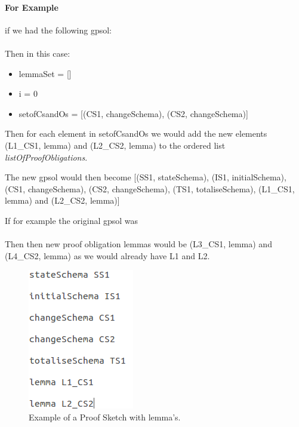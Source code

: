 \paragraph{For Example}

if we had the following \gls{gpsol}: \\
 \\
Then in this case:
\begin{itemize}
\item lemmaSet = []
\item i = 0
\item setofCsandOs = [(CS1, changeSchema), (CS2, changeSchema)]
\end{itemize}

Then for each element in setofCsandOs we would add the new elements (L1\_CS1,
lemma) and (L2\_CS2, lemma) to the ordered list \emph{listOfProofObligations}.

The new \gls{gpsol} would then become [(SS1, stateSchema), (IS1, initialSchema),
(CS1, changeSchema), (CS2, changeSchema), (TS1, totaliseSchema), (L1\_CS1,
lemma) and (L2\_CS2, lemma)]

If for example the original \gls{gpsol} was \\
\\
Then then new proof obligation lemmas would be (L3\_CS1, lemma) and (L4\_CS2,
lemma) as we would already have L1 and L2.

\begin{figure}[H]
\centering
\includegraphics[scale=0.5]{Figures/skeleton/proofskeletonwithpo.png}
\caption{Example of a Proof Sketch with lemma's.}
\label{fig:gpswithpo}
\end{figure}

